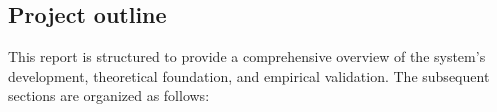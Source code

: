 
\subsection{Project outline}
This report is structured to provide a comprehensive overview of the system's development, theoretical foundation, and empirical validation. The subsequent sections are organized as follows:

